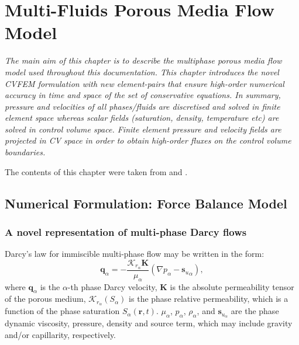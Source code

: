 
\chapter{Multi-Fluids Porous Media Flow Model}\label{ChapterMultiFluidsModel}

\begin{adjustwidth}{1cm}{1cm}
   {\it The main aim of this chapter is to describe the multiphase porous media flow model used throughout this documentation. This chapter introduces the novel CVFEM formulation with new element-pairs that ensure high-order numerical accuracy in time and space of the set of conservative equations. In summary, pressure and velocities of all phases/fluids are discretised and solved in finite element space whereas scalar fields (\eg saturation, density, temperature etc) are solved in control volume space. Finite element pressure and velocity fields are projected in CV space in order to obtain high-order fluxes on the control volume boundaries. 
\medskip

The contents of this chapter were taken from \citet{gomes_2016} and \citet{Fluidity_Manual}.}
\end{adjustwidth}

\section{Numerical Formulation: Force Balance Model}\label{ChapterMultiFluidsModel:Section:overlapping_method_section}

\subsection{A novel representation of multi-phase Darcy flows}\label{ChapterMultiFluidsModel:Section:DarcyModel}
Darcy's law for immiscible multi-phase flow may be written in the form:
\begin{equation}\label{e:darcy_eqn}
  \mathbf{q}_{\alpha} = -\frac{\mathcal{K}_{{r}_\alpha}\mathbf{K}}{\mu_{\alpha}}\left(\nabla p_{\alpha} - {\mathbf{s}_{u}}_{\alpha} \right),
\end{equation}
where $\mathbf{q}_{\alpha}$ is the $\alpha$-th phase Darcy velocity, $\mathbf{K}$ is the absolute permeability tensor of the porous medium, $\mathcal{K}_{{r}_\alpha}\left(S_{\alpha}\right)$ is the phase relative permeability, which is a function of the phase saturation $S_{\alpha}\left(\mathbf{r},t\right)$. $\mu_{\alpha}$, $p_{\alpha}$, $\rho_{\alpha}$, and $\mathbf{s}_{{u}_\alpha}$ are the phase dynamic viscosity, pressure, density and source term, which may include gravity and/or capillarity, respectively. 

